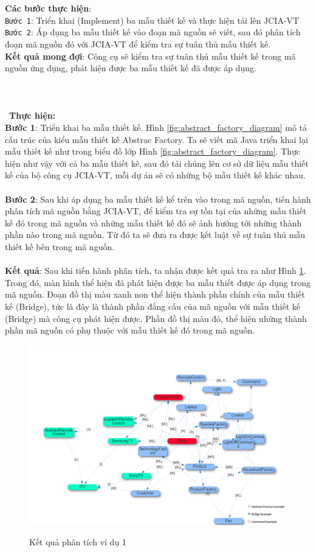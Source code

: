 \documentclass[12pt]{report}
\begin{document}
\noindent \textbf{Các bước thực hiện}:\\
\texttt{Bước 1}: Triển khai (Implement) ba mẫu thiết kế và thực hiện tải lên JCIA-VT\\
\texttt{Bước 2}: Áp dụng ba mẫu thiết kế vào đoạn mã nguồn sẽ viết, sau đó phân tích đoạn mã nguồn đó với JCIA-VT để kiểm tra sự tuân thủ mẫu thiết kế.\\
\noindent \textbf{Kết quả mong đợi}: Công cụ sẽ kiểm tra sự tuân thủ mẫu thiết kế trong mã nguồn ứng dụng, phát hiện được ba mẫu thiết kế đã được áp dụng.\\\\\\\\\
\textbf{Thực hiện:}\\
\noindent \textbf{Bước 1}: Triển khai ba mẫu thiết kế. Hình \ref{fig:abstract_factory_diagram} mô tả cấu trúc của kiểu mẫu thiết kế Abstrac Factory. Ta sẽ viết mã Java triển khai lại mẫu thiết kế như trong biểu đồ lớp Hình \ref{fig:abstract_factory_diagram}. Thực hiện như vậy với cả ba mẫu thiết kê, sau đó tải chúng lên cơ sở dữ liệu mẫu thiết kế của bộ công cụ JCIA-VT, mỗi dự án sẽ có những bộ mẫu thiết kế khác nhau.\\\\
\noindent \textbf{Bước 2}: Sau khi áp dụng ba mẫu thiết kế kể trên vào trong mã nguồn, tiến hành phân tích mã nguồn bằng JCIA-VT, để kiểm tra sự tồn tại của những mẫu thiết kế đó trong mã nguồn và những mẫu thiết kế đó sẽ ảnh hưởng tới những thành phần nào trong mã nguồn. Từ đó ta sẽ đưa ra được kết luật về sự tuân thủ mẫu thiết kế bên trong mã nguồn.\\\\
\noindent \textbf{Kết quả}: Sau khi tiến hành phân tích, ta nhận được kết quả tra ra như Hình \ref{fig:result_example_1}. Trong đó, màn hình thể hiện đã phát hiện được ba mẫu thiết được áp dụng trong mã nguồn. Đoạn đồ thị màu xanh non thể hiện thành phần chính của mẫu thiết kế (Bridge), tức là đây là thành phần đẳng cấu của mã nguồn với mẫu thiết kế (Bridge) mà công cụ phát hiện được. Phần đồ thị màu đỏ, thể hiện những thành phần mã nguồn có phụ thuộc với mẫu thiết kế đó trong mã nguồn.
\begin{figure}[h]
	\centering
	\includegraphics[scale=0.4]{images/result_example_1}
	\label{fig:result_example_1}
	\caption{Kết quả phân tích ví dụ 1}
\end{figure}\\
\end{document}
